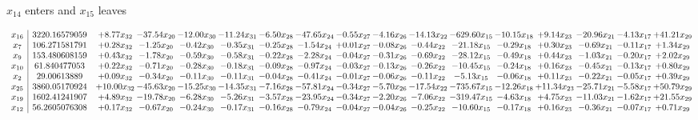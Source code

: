 \documentclass[9pt]{article}
\begin{document}
 $ x_{14} $ enters and $ x_{15} $ leaves 

 \[\begin{array}{c| c c@{\hskip 2pt} c@{\hskip 2pt} c@{\hskip 2pt} c@{\hskip 2pt} c@{\hskip 2pt} c@{\hskip 2pt} c@{\hskip 2pt} c@{\hskip 2pt} c@{\hskip 2pt} c@{\hskip 2pt} c@{\hskip 2pt} c@{\hskip 2pt} c@{\hskip 2pt} c@{\hskip 2pt} c@{\hskip 2pt} }
 x_{16}   &  3220.16579059 & +  8.77 x_{32} & -37.54 x_{20} & -12.00 x_{30} & -11.24 x_{31} & -6.50 x_{28} & -47.65 x_{24} & -0.55 x_{27} & -4.16 x_{26} & -14.13 x_{22} & -629.60 x_{15} & -10.15 x_{18} & +  9.14 x_{23} & -20.96 x_{21} & -4.13 x_{17} & + 41.21 x_{29}\\
 x_{7}   &  106.271581791 & +  0.28 x_{32} & -1.25 x_{20} & -0.42 x_{30} & -0.35 x_{31} & -0.25 x_{28} & -1.54 x_{24} & +  0.01 x_{27} & -0.08 x_{26} & -0.44 x_{22} & -21.18 x_{15} & -0.29 x_{18} & +  0.30 x_{23} & -0.69 x_{21} & -0.11 x_{17} & +  1.34 x_{29}\\
 x_{9}   &  153.480608159 & +  0.43 x_{32} & -1.78 x_{20} & -0.59 x_{30} & -0.58 x_{31} & -0.22 x_{28} & -2.28 x_{24} & -0.04 x_{27} & -0.31 x_{26} & -0.69 x_{22} & -28.12 x_{15} & -0.49 x_{18} & +  0.44 x_{23} & -1.03 x_{21} & -0.20 x_{17} & +  2.02 x_{29}\\
 x_{10}   &  61.840477053 & +  0.22 x_{32} & -0.71 x_{20} & -0.28 x_{30} & -0.18 x_{31} & -0.09 x_{28} & -0.97 x_{24} & -0.03 x_{27} & -0.13 x_{26} & -0.26 x_{22} & -10.45 x_{15} & -0.24 x_{18} & +  0.16 x_{23} & -0.45 x_{21} & -0.13 x_{17} & +  0.80 x_{29}\\
 x_{2}   &  29.00613889 & +  0.09 x_{32} & -0.34 x_{20} & -0.11 x_{30} & -0.11 x_{31} & -0.04 x_{28} & -0.41 x_{24} & -0.01 x_{27} & -0.06 x_{26} & -0.11 x_{22} & -5.13 x_{15} & -0.06 x_{18} & +  0.11 x_{23} & -0.22 x_{21} & -0.05 x_{17} & +  0.39 x_{29}\\
 x_{25}   &  3860.05170924 & + 10.00 x_{32} & -45.63 x_{20} & -15.25 x_{30} & -14.35 x_{31} & -7.16 x_{28} & -57.81 x_{24} & -0.34 x_{27} & -5.70 x_{26} & -17.54 x_{22} & -735.67 x_{15} & -12.26 x_{18} & + 11.34 x_{23} & -25.71 x_{21} & -5.58 x_{17} & + 50.79 x_{29}\\
 x_{19}   &  1602.41241907 & +  4.89 x_{32} & -19.78 x_{20} & -6.28 x_{30} & -5.26 x_{31} & -3.57 x_{28} & -23.95 x_{24} & -0.34 x_{27} & -2.20 x_{26} & -7.06 x_{22} & -319.47 x_{15} & -4.63 x_{18} & +  4.75 x_{23} & -11.03 x_{21} & -1.62 x_{17} & + 21.55 x_{29}\\
 x_{12}   &  56.2605076308 & +  0.17 x_{32} & -0.67 x_{20} & -0.24 x_{30} & -0.17 x_{31} & -0.16 x_{28} & -0.79 x_{24} & -0.04 x_{27} & -0.04 x_{26} & -0.25 x_{22} & -10.60 x_{15} & -0.17 x_{18} & +  0.16 x_{23} & -0.36 x_{21} & -0.07 x_{17} & +  0.71 x_{29}\\

\end{array}\]
\end{document}
